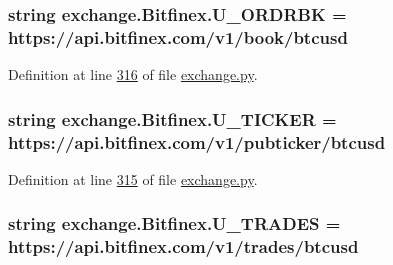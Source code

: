 \subsubsection[{\texorpdfstring{U\+\_\+\+O\+R\+D\+R\+BK}{U_ORDRBK}}]{\setlength{\rightskip}{0pt plus 5cm}string exchange.\+Bitfinex.\+U\+\_\+\+O\+R\+D\+R\+BK = \textquotesingle{}https\+://api.\+bitfinex.\+com/v1/book/btcusd\textquotesingle{}\hspace{0.3cm}{\ttfamily [static]}}\hypertarget{classexchange_1_1_bitfinex_a81c1548dbbb9caacf43e8a6a6e8be3a4}{}\label{classexchange_1_1_bitfinex_a81c1548dbbb9caacf43e8a6a6e8be3a4}


Definition at line \hyperlink{exchange_8py_source_l00316}{316} of file \hyperlink{exchange_8py_source}{exchange.\+py}.

\subsubsection[{\texorpdfstring{U\+\_\+\+T\+I\+C\+K\+ER}{U_TICKER}}]{\setlength{\rightskip}{0pt plus 5cm}string exchange.\+Bitfinex.\+U\+\_\+\+T\+I\+C\+K\+ER = \textquotesingle{}https\+://api.\+bitfinex.\+com/v1/pubticker/btcusd\textquotesingle{}\hspace{0.3cm}{\ttfamily [static]}}\hypertarget{classexchange_1_1_bitfinex_a2980dc6a7a3d6a4391ba0b2fbadfacee}{}\label{classexchange_1_1_bitfinex_a2980dc6a7a3d6a4391ba0b2fbadfacee}


Definition at line \hyperlink{exchange_8py_source_l00315}{315} of file \hyperlink{exchange_8py_source}{exchange.\+py}.

\subsubsection[{\texorpdfstring{U\+\_\+\+T\+R\+A\+D\+ES}{U_TRADES}}]{\setlength{\rightskip}{0pt plus 5cm}string exchange.\+Bitfinex.\+U\+\_\+\+T\+R\+A\+D\+ES = \textquotesingle{}https\+://api.\+bitfinex.\+com/v1/{\bf trades}/btcusd\textquotesingle{}\hspace{0.3cm}{\ttfamily [static]}}\hypertarget{classexchange_1_1_bitfinex_a0c5420b5b95248ee7b57bf694b21f3b5}{}\label{classexchange_1_1_bitfinex_a0c5420b5b95248ee7b57bf694b21f3b5}


